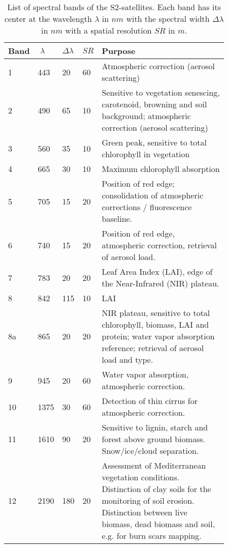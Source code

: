 \begin{table}[!ht]
    \centering
    \small
    \caption{\cite{jaramazESASentinel2Mission2013} List of spectral bands of the S2-satellites. Each band has its center at the wavelength $\lambda$ in $nm$ with the spectral width $\Delta\lambda$ in $nm$ with a spatial resolution $SR$ in $m$.}
    \begin{tabular}{p{0.03\linewidth} p{0.04\linewidth} p{0.03\linewidth} p{0.03\linewidth} p{0.73\linewidth}}
    \toprule
        \hspace*{-5pt} Band & $\;\lambda$ & $\Delta\lambda$ & $SR$ & Purpose \\ \hline
        1 & 443 & 20 & 60 & Atmospheric correction (aerosol scattering) \\ %
        2 & 490 & 65 & 10 & Sensitive to vegetation senescing, carotenoid, browning and soil background; atmospheric correction (aerosol scattering) \\ %
        3 & 560 & 35 & 10 & Green peak, sensitive to total chlorophyll in vegetation \\ %
        4 & 665 & 30 & 10 & Maximum chlorophyll absorption \\ %
        5 & 705 & 15 & 20 & Position of red edge; consolidation of atmospheric corrections / fluorescence baseline. \\ %
        6 & 740 & 15 & 20 & Position of red edge, atmospheric correction, retrieval of aerosol load. \\ %
        7 & 783 & 20 & 20 & Leaf Area Index (LAI), edge of the Near-Infrared (NIR) plateau. \\ %
        8 & 842 & 115 & 10 & LAI \\ %
        8a & 865 & 20 & 20 & NIR plateau, sensitive to total chlorophyll, biomass, LAI and protein; water vapor absorption reference; retrieval of aerosol load and type. \\ %
        9 & 945 & 20 & 60 & Water vapor absorption, atmospheric correction. \\ %
        10 & 1375 & 30 & 60 & Detection of thin cirrus for atmospheric correction. \\ %
        11 & 1610 & 90 & 20 & Sensitive to lignin, starch and forest above ground biomass. Snow/ice/cloud separation. \\ %
        12 & 2190 & 180 & 20 & Assessment of Mediterranean vegetation conditions. Distinction of clay soils for the monitoring of soil erosion. Distinction between live biomass, dead biomass and soil, e.g. for burn scars mapping. \\
        \bottomrule
    \end{tabular}
    \label{table:S2-bands}
\end{table}
